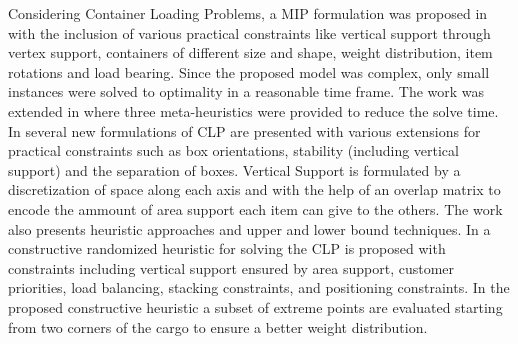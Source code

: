 Considering Container Loading Problems, a MIP formulation was proposed in \citep{paquay2016mixed} with the inclusion of various practical constraints like vertical support through vertex support, containers of different size and shape, weight distribution, item rotations and load bearing.
Since the proposed model was complex, only small instances were solved to optimality in a reasonable time frame. The work was extended in \citep{paquay2007} where three meta-heuristics were provided to reduce the solve time.
In \citep{kurpel2020exact} several new formulations of CLP are presented with various extensions for practical constraints such as box orientations, stability (including vertical support) and the separation of boxes.
Vertical Support is formulated by a discretization of space along each axis and with the help of an overlap matrix to encode the ammount of area support each item can give to the others.
The work also presents heuristic approaches and upper and lower bound techniques.
\citep{Alonso2020} %
In \citep{GAJDA2022102559} a constructive randomized heuristic for solving the CLP is proposed with constraints including vertical support ensured by area support, customer priorities, load balancing, stacking constraints, and positioning constraints.
In the proposed constructive heuristic a subset of extreme points are evaluated starting from two corners of the cargo to ensure a better weight distribution.
